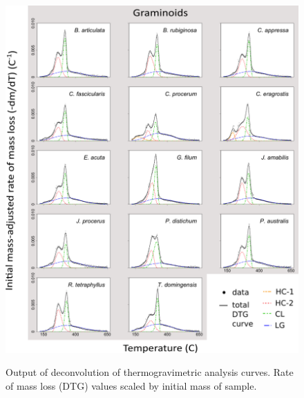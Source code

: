 \documentclass{article}
\begin{document}
\begin{figure}[!ht]
	\centering
	{\includegraphics[width=\textwidth]{figs/TGA_fig_gram.png}}
	\caption{Output of deconvolution of thermogravimetric analysis curves. Rate of mass loss (DTG) values scaled by initial mass of sample.}
	\label{Fig:tga_all}
\end{figure}
\end{document}

